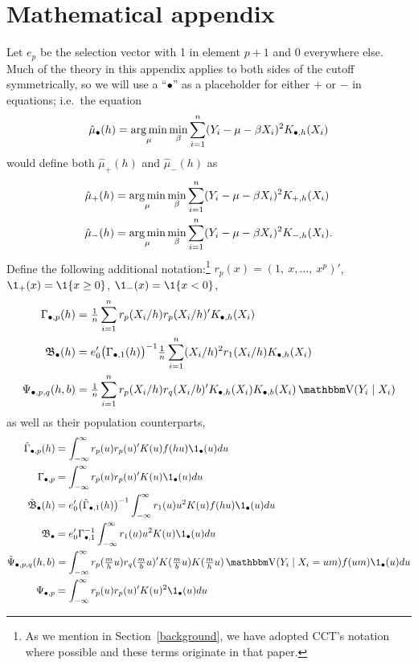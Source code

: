 \documentclass[12pt,fleqn]{article}
\begin{document}
\section{Mathematical appendix}
Let $e_p$ be the selection vector with 1 in element $p+1$ and 0
everywhere else. Much of the theory in this appendix applies to both
sides of the cutoff symmetrically, so we will use a ``$\bullet$'' as a
placeholder for either $+$ or $-$ in equations; i.e.\ the equation
\[
  \hat\mu_\bullet(h) = \operatorname*{arg\,min}_{\mu} \min_{\beta} \sum_{i=1}^n
  (Y_i - \mu - \beta X_i)^2 K_{\bullet,h}(X_i)
\]
would define both $\hat\mu_+(h)$ and $\hat\mu_-(h)$ as
\begin{align*}
  \hat\mu_+(h) &= \operatorname*{arg\,min}_{\mu} \min_{\beta} \sum_{i=1}^n
  (Y_i - \mu - \beta X_i)^2 K_{+,h}(X_i) \\
  \hat\mu_-(h) &= \operatorname*{arg\,min}_{\mu} \min_{\beta} \sum_{i=1}^n
  (Y_i - \mu - \beta X_i)^2 K_{-,h}(X_i).
\end{align*}
Define the following additional notation:\footnote{%
  As we mention in Section~\ref{background}, we have adopted CCT's
  notation where possible and these terms originate in that paper.} %
$r_p(x) = (1,\ x,\dots,\ x^p)'$, $\1_+(x) = \1\{x \geq 0\}$, $\1_-(x) = \1\{x < 0\}$,
\begin{align*}
  \Gamma_{\bullet,p}(h)
  &= \tfrac{1}{n} \sum_{i=1}^n r_p(X_i/h) r_p(X_i/h)' K_{\bullet,h}(X_i) \\
  \Bf_\bullet(h)
  & = e_0' \big(\Gamma_{\bullet,1}(h)\big)^{-1}
    \tfrac{1}{n} \sum_{i=1}^n (X_i / h)^2 r_1(X_i/h) K_{\bullet,h}(X_i) \\
  \Psi_{\bullet,p,q}(h,b)
  &= \tfrac{1}{n} \sum_{i=1}^n r_p(X_i/h) r_q(X_i/b)'
     K_{\bullet,h}(X_i) K_{\bullet,b}(X_i) \V(Y_i \mid X_i)
\end{align*}
as well as their population counterparts,
\begin{align*}
  \Gammat_{\bullet,p}(h) &= \int_{-\infty}^\infty   r_p(u) r_p(u)' K(u) f(h u) \1_\bullet(u) du \\
  \Gamma_{\bullet,p} &= \int_{-\infty}^\infty   r_p(u) r_p(u)' K(u) \1_\bullet(u) du \\
  \Bft_\bullet(h) & = e_0' \big(\Gammat_{\bullet,1}(h)\big)^{-1}
    \int_{-\infty}^\infty r_1(u) u^2 K(u) f(h u) \1_\bullet(u) du \\
  \Bf_\bullet & = e_0' \Gamma_{\bullet,1}^{-1} \int_{-\infty}^\infty r_1(u) u^2 K(u) \1_\bullet(u) du \\
  \Psit_{\bullet,p,q}(h,b) &= \int_{-\infty}^\infty
     r_p(\tfrac{m}{h} u) r_q(\tfrac{m}{b} u)' K(\tfrac{m}{b} u) K(\tfrac{m}{h} u)
     \V(Y_i \mid X_i = um) f(um) \1_\bullet(u) du \\
  \Psi_{\bullet,p} &= \int_{-\infty}^\infty
     r_p(u) r_p(u)' K(u)^2 \1_\bullet(u) du
\end{align*}
\end{document}
